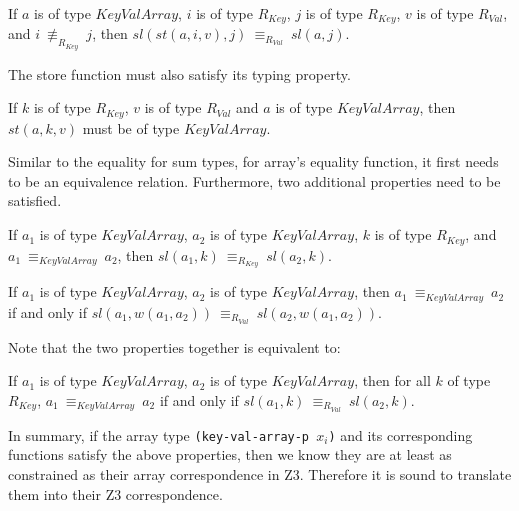 \begin{property}
  If $a$ is of type $KeyValArray$, $i$ is of type $R_{Key}$, $j$ is of type
  $R_{Key}$, $v$ is of type $R_{Val}$, and $i\: \not\equiv_{R_{Key}}\: j$, then
  $sl(st(a, i, v), j)\: \equiv_{R_{Val}}\: sl(a, j)$.
\end{property}

\noindent The store function must also satisfy its typing property.
\begin{property}
  If $k$ is of type $R_{Key}$, $v$ is of type $R_{Val}$ and $a$ is of type
  $KeyValArray$, then $st(a, k, v)$ must be of type $KeyValArray$.
\end{property}

\noindent Similar to the equality for sum types, for array's equality function,
it first needs to be an equivalence relation. Furthermore, two additional
properties need to be satisfied.
\begin{property}
  If $a_1$ is of type $KeyValArray$, $a_2$ is of type $KeyValArray$, $k$ is of
  type $R_{Key}$, and $a_1\: \equiv_{KeyValArray}\: a_2$, then
  $sl(a_1,k)\: \equiv_{R_{Key}}\: sl(a_2,k)$.
\end{property}

\begin{property}
  If $a_1$ is of type $KeyValArray$, $a_2$ is of type $KeyValArray$, then
  $a_1\: \equiv_{KeyValArray}\: a_2$ if and only if
  $sl(a_1, w(a_1, a_2))\: \equiv_{R_{Val}}\: sl(a_2, w(a_1, a_2))$.
\end{property}

\noindent Note that the two properties together is equivalent to:
\begin{property}
  If $a_1$ is of type $KeyValArray$, $a_2$ is of type $KeyValArray$, then
  for all $k$ of type $R_{Key}$, $a_1\: \equiv_{KeyValArray}\: a_2$ if and only
  if $sl(a_1, k)\: \equiv_{R_{Val}}\: sl(a_2, k)$.
\end{property}

In summary, if the array type \texttt{(key-val-array-p $x_i$)} and its
corresponding functions satisfy the above properties, then we know they are at
least as constrained as their array correspondence in Z3. Therefore it is sound
to translate them into their Z3 correspondence.

